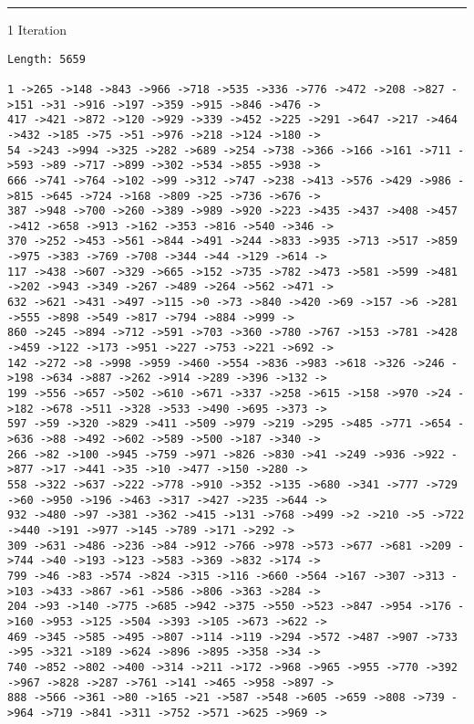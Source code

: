 \documentclass[letter, 12pt]{article}
\newenvironment{question}[1]{%
    \vspace{.2in}%
        \noindent{\bf #1}%
    \vspace{0.3em} \hrule \vspace{.1in}%
}{}
\begin{document}
\begin{question}{\large Appendix}
1 Iteration
\begin{lstlisting}[style=CStyle]
Length: 5659

1 ->265 ->148 ->843 ->966 ->718 ->535 ->336 ->776 ->472 ->208 ->827 ->151 ->31 ->916 ->197 ->359 ->915 ->846 ->476 ->
417 ->421 ->872 ->120 ->929 ->339 ->452 ->225 ->291 ->647 ->217 ->464 ->432 ->185 ->75 ->51 ->976 ->218 ->124 ->180 ->
54 ->243 ->994 ->325 ->282 ->689 ->254 ->738 ->366 ->166 ->161 ->711 ->593 ->89 ->717 ->899 ->302 ->534 ->855 ->938 ->
666 ->741 ->764 ->102 ->99 ->312 ->747 ->238 ->413 ->576 ->429 ->986 ->815 ->645 ->724 ->168 ->809 ->25 ->736 ->676 ->
387 ->948 ->700 ->260 ->389 ->989 ->920 ->223 ->435 ->437 ->408 ->457 ->412 ->658 ->913 ->162 ->353 ->816 ->540 ->346 ->
370 ->252 ->453 ->561 ->844 ->491 ->244 ->833 ->935 ->713 ->517 ->859 ->975 ->383 ->769 ->708 ->344 ->44 ->129 ->614 ->
117 ->438 ->607 ->329 ->665 ->152 ->735 ->782 ->473 ->581 ->599 ->481 ->202 ->943 ->349 ->267 ->489 ->264 ->562 ->471 ->
632 ->621 ->431 ->497 ->115 ->0 ->73 ->840 ->420 ->69 ->157 ->6 ->281 ->555 ->898 ->549 ->817 ->794 ->884 ->999 ->
860 ->245 ->894 ->712 ->591 ->703 ->360 ->780 ->767 ->153 ->781 ->428 ->459 ->122 ->173 ->951 ->227 ->753 ->221 ->692 ->
142 ->272 ->8 ->998 ->959 ->460 ->554 ->836 ->983 ->618 ->326 ->246 ->198 ->634 ->887 ->262 ->914 ->289 ->396 ->132 ->
199 ->556 ->657 ->502 ->610 ->671 ->337 ->258 ->615 ->158 ->970 ->24 ->182 ->678 ->511 ->328 ->533 ->490 ->695 ->373 ->
597 ->59 ->320 ->829 ->411 ->509 ->979 ->219 ->295 ->485 ->771 ->654 ->636 ->88 ->492 ->602 ->589 ->500 ->187 ->340 ->
266 ->82 ->100 ->945 ->759 ->971 ->826 ->830 ->41 ->249 ->936 ->922 ->877 ->17 ->441 ->35 ->10 ->477 ->150 ->280 ->
558 ->322 ->637 ->222 ->778 ->910 ->352 ->135 ->680 ->341 ->777 ->729 ->60 ->950 ->196 ->463 ->317 ->427 ->235 ->644 ->
932 ->480 ->97 ->381 ->362 ->415 ->131 ->768 ->499 ->2 ->210 ->5 ->722 ->440 ->191 ->977 ->145 ->789 ->171 ->292 ->
309 ->631 ->486 ->236 ->84 ->912 ->766 ->978 ->573 ->677 ->681 ->209 ->744 ->40 ->193 ->123 ->583 ->369 ->832 ->174 ->
799 ->46 ->83 ->574 ->824 ->315 ->116 ->660 ->564 ->167 ->307 ->313 ->103 ->433 ->867 ->61 ->586 ->806 ->363 ->284 ->
204 ->93 ->140 ->775 ->685 ->942 ->375 ->550 ->523 ->847 ->954 ->176 ->160 ->953 ->125 ->504 ->393 ->105 ->673 ->622 ->
469 ->345 ->585 ->495 ->807 ->114 ->119 ->294 ->572 ->487 ->907 ->733 ->95 ->321 ->189 ->624 ->896 ->895 ->358 ->34 ->
740 ->852 ->802 ->400 ->314 ->211 ->172 ->968 ->965 ->955 ->770 ->392 ->967 ->828 ->287 ->761 ->141 ->465 ->958 ->897 ->
888 ->566 ->361 ->80 ->165 ->21 ->587 ->548 ->605 ->659 ->808 ->739 ->964 ->719 ->841 ->311 ->752 ->571 ->625 ->969 ->

\end{lstlisting}
\end{question}
\end{document}
